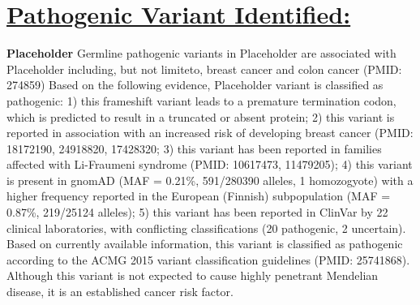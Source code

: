 \documentclass[11pt]{extarticle}
\begin{document}
\section*{\underline {Pathogenic Variant Identified:}\newline}
{\bf Placeholder}
\newline
Germline pathogenic variants in Placeholder are associated with Placeholder including, but not limiteto, breast cancer and colon cancer (PMID: 274859)
\newline
Based on the following evidence, Placeholder variant is classified as pathogenic: 1) this frameshift variant leads to a premature termination codon, which is predicted to result in a truncated or absent protein; 2) this variant is reported in association with an increased risk of developing breast cancer (PMID: 18172190, 24918820, 17428320; 3) this variant has been reported in families affected with Li-Fraumeni syndrome (PMID: 10617473, 11479205); 4) this variant is present in gnomAD (MAF = 0.21\%, 591/280390 alleles, 1 homozogyote) with a higher frequency reported in the European (Finnish) subpopulation (MAF = 0.87\%, 219/25124 alleles); 5) this variant has been reported in ClinVar by 22 clinical laboratories, with conflicting classifications (20 pathogenic, 2 uncertain). Based on currently available information, this variant is classified as pathogenic according to the ACMG 2015 variant classification guidelines (PMID: 25741868). Although this variant is not expected to cause highly penetrant Mendelian disease, it is an established cancer risk factor. 
\end{document}

